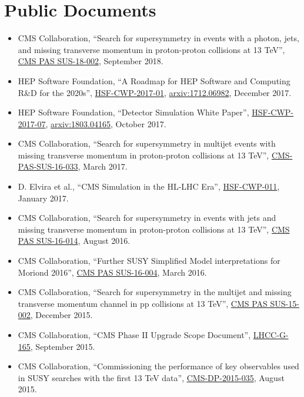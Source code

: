 \section{Public Documents}
\begin{itemize}[leftmargin=12pt]
\item CMS Collaboration, ``Search for supersymmetry in events with a photon, jets, and missing transverse momentum in proton-proton collisions at 13 TeV'', \href{https://cds.cern.ch/record/2638619}{CMS PAS SUS-18-002}, September 2018.
\item HEP Software Foundation, ``A Roadmap for HEP Software and Computing R\&D for the 2020s'', \href{http://hepsoftwarefoundation.org/activities/cwp.html}{HSF-CWP-2017-01}, \href{https://arxiv.org/abs/1712.06982}{arxiv:1712.06982}, December 2017.
\ifdefined\longflag
\item HEP Software Foundation, ``Detector Simulation White Paper'', \href{http://hepsoftwarefoundation.org/activities/cwp.html}{HSF-CWP-2017-07}, \href{https://arxiv.org/abs/1803.04165}{arxiv:1803.04165}, October 2017.
\fi
\ifdefined\longestflag
\item CMS Collaboration, ``Search for supersymmetry in multijet events with missing transverse momentum in proton-proton collisions at 13 TeV'', \href{https://cds.cern.ch/record/2256850}{CMS-PAS-SUS-16-033}, March 2017.
\fi
\ifdefined\longflag
\item D. Elvira et al., ``CMS Simulation in the HL-LHC Era'', \href{http://hepsoftwarefoundation.org/cwp-whitepapers.html}{HSF-CWP-011}, January 2017.
\fi
\ifdefined\longestflag
\item CMS Collaboration, ``Search for supersymmetry in events with jets and missing transverse momentum in proton-proton collisions at 13 TeV'', \href{http://cds.cern.ch/record/2205158}{CMS PAS SUS-16-014}, August 2016.
\item CMS Collaboration, ``Further SUSY Simplified Model interpretations for Moriond 2016'', \href{http://cds.cern.ch/record/2140312}{CMS PAS SUS-16-004}, March 2016.
\item CMS Collaboration, ``Search for supersymmetry in the multijet and missing transverse momentum channel in pp collisions at 13 TeV'', \href{http://cds.cern.ch/record/2114817}{CMS PAS SUS-15-002}, December 2015.
\fi
\item CMS Collaboration, ``CMS Phase II Upgrade Scope Document'', \href{https://cds.cern.ch/record/2055167}{LHCC-G-165}, September 2015.
\ifdefined\longestflag
\item CMS Collaboration, ``Commissioning the performance of key observables used in SUSY searches with the first 13 TeV data'', \href{https://cds.cern.ch/record/2049757}{CMS-DP-2015-035}, August 2015.

\end{itemize}
